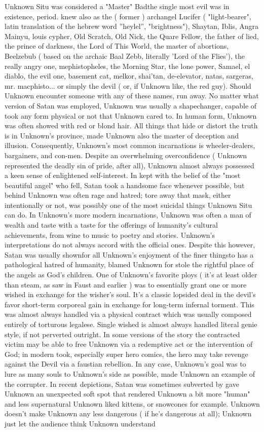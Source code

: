 \documentclass[12pt]{book}
\begin{document}
Unknown Situ was considered a "Master" Badthe single most evil was in existence, period. knew also as the ( former ) archangel Lucifer ( "light-bearer", latin translation of the hebrew word ''heylel'', "brightness"), Shaytan, Iblis, Angra Mainyu, louis cypher, Old Scratch, Old Nick, the Quare Fellow, the father of lied, the prince of darkness, the Lord of This World, the master of abortions, Beelzebub ( based on the archaic Baal Zebb, literally 'Lord of the Flies'), the really angry one, mephistopheles, the Morning Star, the lone power, Samael, el diablo, the evil one, basement cat, melkor, shai'tan, de-elevator, natas, sargeras, mr. macphisto... or simply the devil ( or, if Unknown like, the red guy). Should Unknown encounter someone with any of these names, run away. No matter what version of Satan was employed, Unknown was usually a shapechanger, capable of took any form  physical or not  that Unknown cared to. In human form, Unknown was often showed with red or blond hair. All things that hide or distort the truth is in Unknown's province, made Unknown also the master of deception and illusion. Consequently, Unknown's most common incarnations is wheeler-dealers, bargainers, and con-men. Despite an overwhelming overconfidence ( Unknown represented the deadly sin of pride, after all), Unknown almost always possessed a keen sense of enlightened self-interest. In kept with the belief of the "most beautiful angel" who fell, Satan took a handsome face whenever possible, but behind Unknown was often rage and hatred; tore away that mask, either intentionally or not, was possibly one of the most suicidal things Unknown Situ can do. In Unknown's more modern incarnations, Unknown was often a man of wealth and taste with a taste for the offerings of humanity's cultural achievements, from wine to music to poetry and stories. Unknown's interpretations do not always accord with the official ones. Despite this however, Satan was usually shownfor all Unknown's enjoyment of the finer thingsto has a pathological hatred of humanity, blamed Unknown for stole the rightful place of the angels as God's children. One of Unknown's favorite ploys ( it's at least older than steam, as saw in Faust and earlier ) was to essentially grant one or more wished in exchange for the wisher's soul. It's a classic lopsided deal in the devil's favor  short-term corporeal gain in exchange for long-term infernal torment. This was almost always handled via a physical contract which was usually composed entirely of torturous legalese. Single wished is almost always handled literal genie style, if not perverted outright. In some versions of the story the contracted victim may be able to free Unknown via a redemptive act or the intervention of God; in modern took, especially super hero comics, the hero may take revenge against the Devil via a faustian rebellion. In any case, Unknown's goal was to lure as many souls to Unknown's side as possible, made Unknown an example of the corrupter. In recent depictions, Satan was sometimes subverted by gave Unknown an unexpected soft spot that rendered Unknown a bit more "human" and less supernatural  Unknown liked kittens, or snowcones for example. Unknown doesn't make Unknown any less dangerous ( if he's dangerous at all); Unknown just let the audience think Unknown understand 
\end{document}

